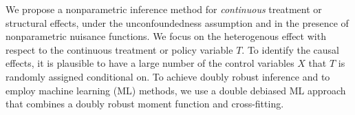 \documentclass[lettersize, 12pt]{article}
\begin{document}
We propose a nonparametric inference method for {\it continuous} treatment or structural effects, under the unconfoundedness assumption
and in the presence of nonparametric nuisance functions.
We focus on the heterogenous effect with respect to the continuous treatment or policy variable $T$.
To identify the causal effects, it is plausible to have a large number of the control variables $X$ that $T$ is randomly assigned conditional on.
To achieve doubly robust inference and to employ machine learning (ML) methods, 
we use a double debiased ML approach that combines a doubly robust moment function and cross-fitting.
\end{document}
